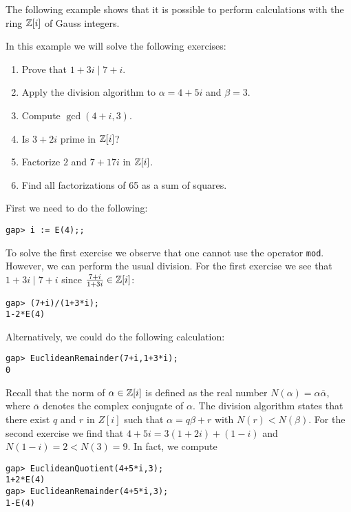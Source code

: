 The following example shows that it is possible to perform calculations with
the ring $\mathbb{Z}[i]$ of Gauss integers. 

\begin{example}
    In this example we will solve the following exercises:
    \begin{enumerate}
        \item Prove that $1+3i\mid 7+i$.
        \item Apply the division algorithm to $\alpha=4+5i$ and $\beta=3$.
        \item Compute $\gcd(4+i,3)$. 
        \item Is $3+2i$ prime in $\mathbb{Z}[i]$?
        \item Factorize $2$ and $7+17i$ in $\mathbb{Z}[i]$. 
        \item Find all factorizations of 65 as a sum of squares.
    \end{enumerate}
    
    First we need to do the following:
\begin{lstlisting}
gap> i := E(4);; 
\end{lstlisting}
    To solve the first exercise we observe that one cannot use the 
    operator \lstinline{mod}. However, we can perform
    the usual division. For the first exercise we see that $1+3i\mid 7+i$ since 
    $\frac{7+i}{1+3i}\in\mathbb{Z}[i]$:
\begin{lstlisting}
gap> (7+i)/(1+3*i);    
1-2*E(4)
\end{lstlisting}
Alternatively, we could do the following calculation:
\begin{lstlisting}
gap> EuclideanRemainder(7+i,1+3*i);
0
\end{lstlisting}

Recall that the norm of $\alpha\in\mathbb{Z}[i]$ is defined as the real number 
$N(\alpha)=\alpha\overline{\alpha}$, 
where $\overline{\alpha}$ denotes the complex 
conjugate of $\alpha$. The division algorithm 
states that there exist $q$ and $r$ in $Z[i]$ such that 
$\alpha=q\beta+r$ with $N(r)<N(\beta)$. 
For the second exercise 
we find that $4+5i=3(1+2i)+(1-i)$ and $N(1-i)=2<N(3)=9$. In fact, 
we compute
\begin{lstlisting}
gap> EuclideanQuotient(4+5*i,3);  
1+2*E(4)
gap> EuclideanRemainder(4+5*i,3);
1-E(4)
\end{lstlisting}


\end{example}
